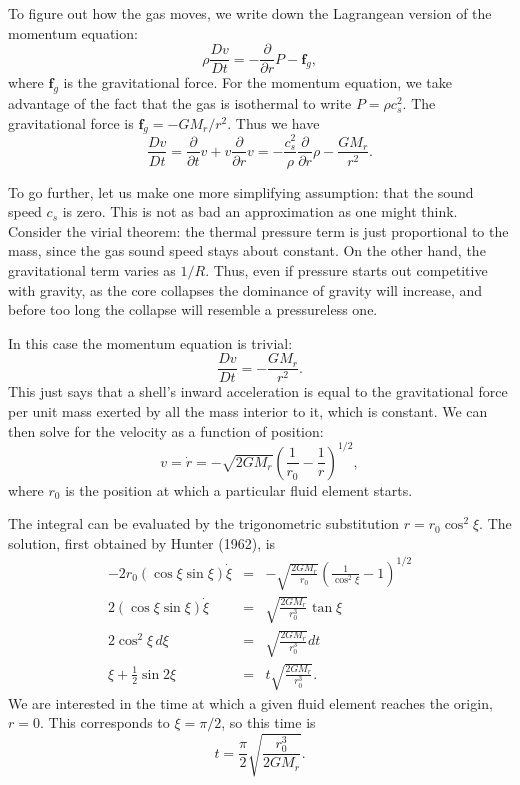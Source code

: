 To figure out how the gas moves, we write down the Lagrangean version of the momentum equation:
\begin{equation}
\rho \frac{Dv}{Dt} = -\frac{\partial}{\partial r}P - \mathbf{f}_g,
\end{equation}
where $\mathbf{f}_g$ is the gravitational force. For the momentum equation, we take advantage of the fact that the gas is isothermal to write $P=\rho c_s^2$. The gravitational force is $\mathbf{f}_g = -G M_r / r^2$. Thus we have
\begin{equation}
\frac{Dv}{Dt}= \frac{\partial}{\partial t}v + v\frac{\partial}{\partial r} v= -\frac{c_s^2}{\rho} \frac{\partial}{\partial r}{\rho} - \frac{G M_r}{r^2}.
\end{equation}

To go further, let us make one more simplifying assumption: that the sound speed $c_s$ is zero. This is not as bad an approximation as one might think. Consider the virial theorem: the thermal pressure term is just proportional to the mass, since the gas sound speed stays about constant. On the other hand, the gravitational term varies as $1/R$. Thus, even if pressure starts out competitive with gravity, as the core collapses the dominance of gravity will increase, and before too long the collapse will resemble a pressureless one.

In this case the momentum equation is trivial:
\begin{equation}
\frac{Dv}{Dt} = -\frac{GM_r}{r^2}.
\end{equation}
This just says that a shell's inward acceleration is equal to the gravitational force per unit mass exerted by all the mass interior to it, which is constant. We can then solve for the velocity as a function of position:
\begin{equation}
v = \dot{r} = -\sqrt{2GM_r}\left(\frac{1}{r_0}-\frac{1}{r}\right)^{1/2},
\end{equation}
where $r_0$ is the position at which a particular fluid element starts. 

The integral can be evaluated by the trigonometric substitution $r=r_0 \cos^2\xi$. The solution, first obtained by Hunter (1962), is
\begin{eqnarray}
-2 r_0 (\cos\xi \sin\xi) \dot{\xi} & = & -\sqrt{\frac{2GM_r}{r_0}} \left(\frac{1}{\cos^2\xi}-1\right)^{1/2} \\
2 (\cos\xi\sin\xi) \dot{\xi} & = & \sqrt{\frac{2GM_r}{r_0^3}}\tan\xi \\
2 \cos^2\xi\, d\xi & = & \sqrt{\frac{2GM_r}{r_0^3}} dt \\
\xi+\frac{1}{2}\sin 2\xi & = & t \sqrt{\frac{2GM_r}{r_0^3}}.
\end{eqnarray}
We are interested in the time at which a given fluid element reaches the origin, $r=0$. This corresponds to $\xi = \pi/2$, so this time is
\begin{equation}
t = \frac{\pi}{2}\sqrt{\frac{r_0^3}{2 G M_r}}.
\end{equation}

